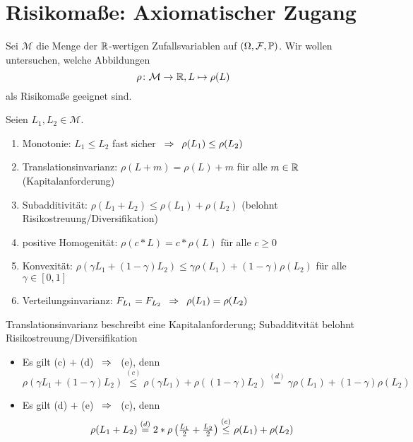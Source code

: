 \section{Risikomaße: Axiomatischer Zugang}

Sei $\mathcal{M}$ die Menge der $\mathbb{R}$-wertigen Zufallsvariablen auf $(\Omega, \mathcal{F}, \mathbb{P})$. Wir wollen untersuchen, welche Abbildungen 
\begin{equation*}
\abb{\rho}{\mathcal{M}}{\R}, L \mapsto \rho(L)
\end{equation*}
als Risikomaße geeignet sind.

\begin{*definition}
	Seien $L_1, L_2 \in \mathcal{M}$.
	\begin{enumerate}[label=(\alph*), nolistsep]
		\item Monotonie: $L_1 \le L_2$ fast sicher $\enskip \Rightarrow \enskip \rho(L_1) \le \rho(L_2)$
		\item Translationsinvarianz: $\rho(L + m) = \rho(L) + m$ für alle $m \in \mathbb{R}$ (Kapitalanforderung)
		\item Subadditivität: $\rho(L_1 + L_2) \le \rho(L_1) + \rho(L_2)$ (belohnt Risikostreuung/Diversifikation)
		\item positive Homogenität: $\rho(c * L) = c * \rho(L)$ für alle $c \ge 0$
		\item Konvexität: $\rho(\gamma L_1 + (1-\gamma) L_2) \le \gamma \rho(L_1) + (1-\gamma) \rho(L_2)$ für alle $\gamma \in [0,1]$
		\item Verteilungsinvarianz: $F_{L_1} = F_{L_2} \enskip \Rightarrow \enskip \rho(L_1) = \rho(L_2)$
	\end{enumerate}
\end{*definition}

\begin{*bemerkung_inline}
	Translationsinvarianz beschreibt eine Kapitalanforderung; Subadditvität belohnt Risikostreuung/Diversifikation
	\begin{itemize}[nolistsep]
		\item Es gilt (c) $+$ (d) $\enskip \Rightarrow \enskip$ (e), denn
		\begin{equation*}
		\rho(\gamma L_1 + (1-\gamma) L_2) \overset{(c)}{\le} \rho(\gamma L_1) + \rho((1-\gamma) L_2) \overset{(d)}{=} \gamma \rho(L_1) + (1-\gamma) \rho(L_2)
		\end{equation*}
		\item Es gilt (d) $+$ (e) $\enskip \Rightarrow \enskip$ (c), denn
		\begin{equation*}
		\rho(L_1 + L_2) \overset{(d)}{=} 2 * \rho \left( \tfrac{L_1}{2} + \tfrac{L_2}{2} \right) \overset{(e)}{\le} \rho(L_1) + \rho(L_2)
		\end{equation*}
	\end{itemize}
\end{*bemerkung_inline}

